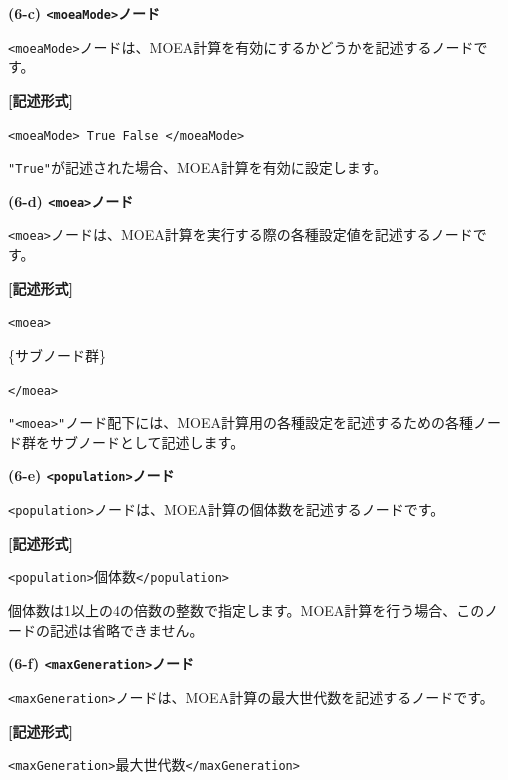 \documentclass[a4paper,11pt]{jarticle}
\begin{document}
{\vspace{12pt}
\leftskip=0pt
\textbf{(6-c) \texttt{<moeaMode>}ノード}

\texttt{<moeaMode>}ノードは、MOEA計算を有効にするかどうかを記述するノードです。

\vspace{8pt}
\leftskip=12pt
\textbf{[記述形式]}

\leftskip=42pt
\texttt{<moeaMode> True \textbar{} False </moeaMode>}

\vspace{8pt}
\leftskip=0pt
\texttt{"True"}が記述された場合、MOEA計算を有効に設定します。

\vspace{12pt}
\leftskip=0pt
\textbf{(6-d) \texttt{<moea>}ノード}

\texttt{<moea>}ノードは、MOEA計算を実行する際の各種設定値を記述するノードです。

\vspace{8pt}
\leftskip=12pt
\textbf{[記述形式]}

\leftskip=42pt
\texttt{<moea>}

\parindent=14pt
\{サブノード群\}

\parindent=0pt
\texttt{</moea>}

\vspace{8pt}
\leftskip=0pt
\texttt{"<moea>"}ノード配下には、MOEA計算用の各種設定を記述するための各種ノード群をサブノードとして記述します。

\vspace{12pt}
\textbf{(6-e) \texttt{<population>}ノード}

\texttt{<population>}ノードは、MOEA計算の個体数を記述するノードです。

\vspace{8pt}
\leftskip=12pt
\textbf{[記述形式]}

\leftskip=42pt
\texttt{<population>}個体数\texttt{</population>}

\vspace{8pt}
\leftskip=0pt
個体数は1以上の4の倍数の整数で指定します。MOEA計算を行う場合、このノードの記述は省略できません。

\vspace{12pt}
\textbf{(6-f) \texttt{<maxGeneration>}ノード}

\texttt{<maxGeneration>}ノードは、MOEA計算の最大世代数を記述するノードです。

\vspace{8pt}
\leftskip=12pt
\textbf{[記述形式]}

\leftskip=42pt
\texttt{<maxGeneration>}最大世代数\texttt{</maxGeneration>}

}
\end{document}
